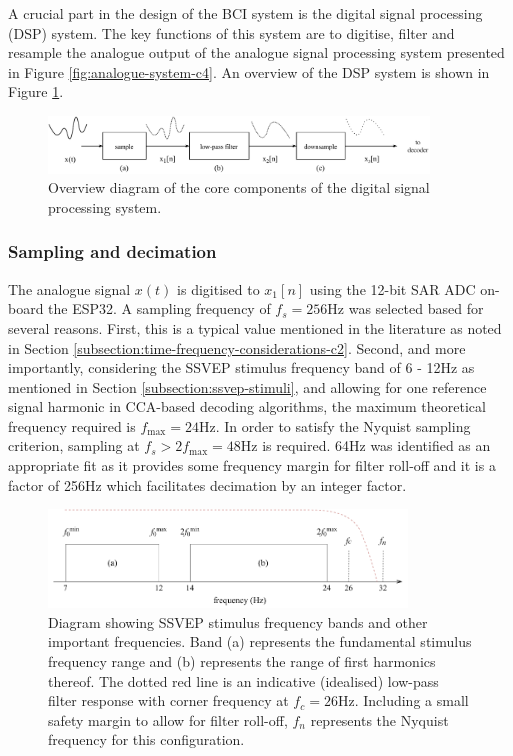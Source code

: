 A crucial part in the design of the BCI system is the digital signal processing (DSP) system. The key functions of this system are to digitise, filter and resample the analogue output of the analogue signal processing system presented in Figure \ref{fig:analogue-system-c4}. An overview of the DSP system is shown in Figure \ref{fig:digital-system-c5}.

\begin{figure}[!htb]
    \centering
    \includegraphics[width=0.9\textwidth]{digital-system}
    \caption[Digital signal processing system]{Overview diagram of the core components of the digital signal processing system.}
    \label{fig:digital-system-c5}
\end{figure}

\subsubsection{Sampling and decimation}
The analogue signal $x(t)$ is digitised to $x_1[n]$ using the 12-bit SAR ADC on-board the ESP32. A sampling frequency of $f_s=256$Hz was selected based for several reasons. First, this is a typical value mentioned in the literature as noted in Section \ref{subsection:time-frequency-considerations-c2}. Second, and more importantly, considering the SSVEP stimulus frequency band of 6 - 12Hz as mentioned in Section \ref{subsection:ssvep-stimuli}, and allowing for one reference signal harmonic in CCA-based decoding algorithms, the maximum theoretical frequency required is $f_{\textrm{max}}=24$Hz. In order to satisfy the Nyquist sampling criterion, sampling at $f_s > 2f_{\textrm{max}} = 48$Hz is required. 64Hz was identified as an appropriate fit as it provides some frequency margin for filter roll-off and it is a factor of 256Hz which facilitates decimation by an integer factor.

\begin{figure}
    \centering
    \includegraphics[width=0.85\textwidth]{ssvep-bands}
    \caption[Diagram showing SSVEP stimulus frequency bands and other important frequencies]{Diagram showing SSVEP stimulus frequency bands and other important frequencies. Band (a) represents the fundamental stimulus frequency range and (b) represents the range of first harmonics thereof. The dotted red line is an indicative (idealised) low-pass filter response with corner frequency at $f_c=26$Hz. Including a small safety margin to allow for filter roll-off, $f_n$ represents the Nyquist frequency for this configuration.}
    \label{fig:ssvep-bands}
\end{figure}

